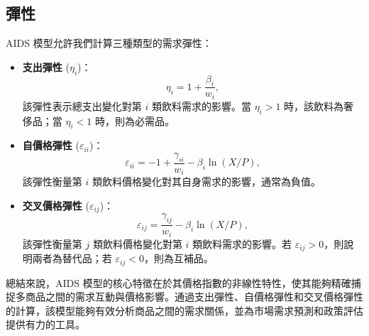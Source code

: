 \subsection*{彈性}
AIDS 模型允許我們計算三種類型的需求彈性：
\begin{itemize}
    \item \textbf{支出彈性} (\(\eta_i\))：
    \[
    \eta_i = 1 + \frac{\beta_i}{w_i},
    \]
    該彈性表示總支出變化對第 \(i\) 類飲料需求的影響。當 \(\eta_i > 1\) 時，該飲料為奢侈品；當 \(\eta_i < 1\) 時，則為必需品。
    \item \textbf{自價格彈性} (\(\varepsilon_{ii}\))：
    \[
    \varepsilon_{ii} = -1 + \frac{\gamma_{ii}}{w_i} - \beta_i \ln(X / P),
    \]
    該彈性衡量第 \(i\) 類飲料價格變化對其自身需求的影響，通常為負值。
    \item \textbf{交叉價格彈性} (\(\varepsilon_{ij}\))：
    \[
    \varepsilon_{ij} = \frac{\gamma_{ij}}{w_i} - \beta_i \ln(X / P),
    \]
    該彈性衡量第 \(j\) 類飲料價格變化對第 \(i\) 類飲料需求的影響。若 \(\varepsilon_{ij} > 0\)，則說明兩者為替代品；若 \(\varepsilon_{ij} < 0\)，則為互補品。
\end{itemize}

總結來說，AIDS 模型的核心特徵在於其價格指數的非線性特性，使其能夠精確捕捉多商品之間的需求互動與價格影響。通過支出彈性、自價格彈性和交叉價格彈性的計算，該模型能夠有效分析商品之間的需求關係，並為市場需求預測和政策評估提供有力的工具。
